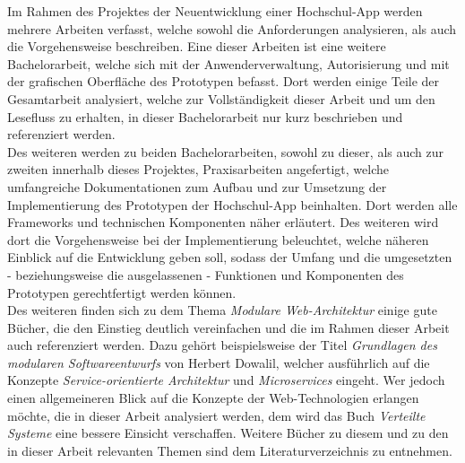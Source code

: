 Im Rahmen des Projektes der Neuentwicklung einer Hochschul-\ac{App} werden mehrere Arbeiten verfasst, welche sowohl die Anforderungen analysieren, als auch die Vorgehensweise beschreiben. Eine dieser Arbeiten ist eine weitere Bachelorarbeit, welche sich mit der Anwenderverwaltung, Autorisierung und mit der grafischen Oberfläche des Prototypen befasst\autocite[][]{andreasba}. Dort werden einige Teile der Gesamtarbeit analysiert, welche zur Vollständigkeit dieser Arbeit und um den Lesefluss zu erhalten, in dieser Bachelorarbeit nur kurz beschrieben und referenziert werden.
\\
\linebreak
Des weiteren werden zu beiden Bachelorarbeiten, sowohl zu dieser, als auch zur zweiten innerhalb dieses Projektes\autocite[][]{andreasba}, Praxisarbeiten angefertigt, welche umfangreiche Dokumentationen zum Aufbau und zur Umsetzung der Implementierung des Prototypen der Hochschul-\ac{App} beinhalten. Dort werden alle Frameworks und technischen Komponenten näher erläutert. Des weiteren wird dort die Vorgehensweise bei der Implementierung beleuchtet, welche näheren Einblick auf die Entwicklung geben soll, sodass der Umfang und die umgesetzten - beziehungsweise die ausgelassenen - Funktionen und Komponenten des Prototypen gerechtfertigt werden können\autocites[][]{dnpa}[][]{andreaspa}.
\\
\linebreak
Des weiteren finden sich zu dem Thema \textit{Modulare Web-Architektur} einige gute Bücher, die den Einstieg deutlich vereinfachen und die im Rahmen dieser Arbeit auch referenziert werden. Dazu gehört beispielsweise der Titel \textit{Grundlagen des modularen Softwareentwurfs}\autocite[][]{gmodse} von Herbert Dowalil, welcher ausführlich auf die Konzepte \textit{Service-orientierte Architektur} und \textit{Microservices} eingeht. Wer jedoch einen allgemeineren Blick auf die Konzepte der Web-Technologien erlangen möchte, die in dieser Arbeit analysiert werden, dem wird das Buch \textit{Verteilte Systeme}\autocite[][]{verteiltesys} eine bessere Einsicht verschaffen. Weitere Bücher zu diesem und zu den in dieser Arbeit relevanten Themen sind dem Literaturverzeichnis zu entnehmen.